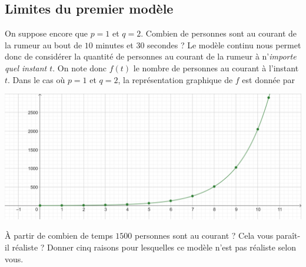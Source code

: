 \documentclass{exam}
\begin{document}
\begin{questions}
\section{Limites du premier modèle}
\question On suppose encore que $p = 1$ et $q = 2$. Combien de personnes sont au courant de la rumeur au bout de $10$ minutes et $30$ secondes ?
\makeemptybox{2cm}
Le modèle continu nous permet donc de considérer la quantité de personnes au courant de la rumeur à n'\emph{importe quel instant $t$}. On note donc $f(t)$ le nombre de personnes au courant à l'instant $t$.
\question Dans le cas où $p=1$ et $q=2$, la représentation graphique de $f$ est donnée par
\begin{center}
\includegraphics[scale=1]{Modele.png}
\end{center}
À partir de combien de temps $1500$ personnes sont au courant ? Cela vous paraît-il réaliste ?
\question Donner cinq raisons pour lesquelles ce modèle n'est pas réaliste selon vous.
\makeemptybox{4cm}
\end{questions}
\end{document}
